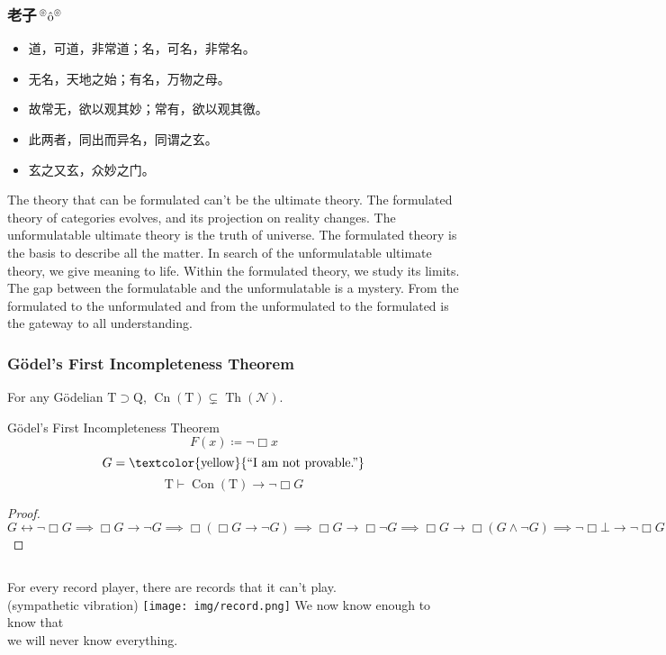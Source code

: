 \documentclass[UTF8,aspectratio=43,11pt,colorlinks,compress,openany]{beamer}%
\begin{document}
\begin{frame}\frametitle{老子$\sideset{^\circledcirc}{^\circledcirc}{\operatorname{\hat{o}}}$}
\begin{itemize}
	\item 道，可道，非常道；名，可名，非常名。
	\item 无名，天地之始；有名，万物之母。
	\item 故常无，欲以观其妙；常有，欲以观其徼。
	\item 此两者，同出而异名，同谓之玄。
	\item 玄之又玄，众妙之门。
\end{itemize}
\begin{block}{}
	The theory that can be formulated can't be the ultimate theory. The formulated theory of categories evolves, and its projection on reality changes. The unformulatable ultimate theory is the truth of universe. The formulated theory is the basis to describe all the matter. In search of the unformulatable ultimate theory, we give meaning to life. Within the formulated theory, we study its limits. The gap between the formulatable and the unformulatable is a mystery. From the formulated to the unformulated and from the unformulated to the formulated is the gateway to all understanding.
\end{block}
\end{frame}

\begin{frame}\frametitle{G\"odel's First Incompleteness Theorem}
\setlength\abovedisplayskip{0pt}
\setlength\belowdisplayskip{0pt}
	\begin{theorem}
		For any G\"odelian $\mathrm{T}\supset \mathrm{Q}$, $\operatorname{Cn}(\mathrm{T})\subsetneq \operatorname{Th}(\mathcal{N})$.
	\end{theorem}
	\begin{block}{G\"odel's First Incompleteness Theorem}
		\[F(x)\coloneqq \neg\Box x\]
		\[G=\text{\textcolor{yellow}{``I am not provable.''}}\]
		\[\mathrm{T}\vdash\operatorname{Con}(\mathrm{T})\to\neg\Box G\]
	\end{block}
\begin{proof}
$G\leftrightarrow\neg\Box G\implies\Box G\to\neg G\implies\Box(\Box G\to\neg G)\implies\Box G\to\Box\neg G\implies\Box G\to\Box(G\wedge\neg G)\implies\neg\Box\bot\to\neg\Box G$
\end{proof}
\begin{columns}
	{\footnotesize For every record player, there are records that it can't play.\\(sympathetic vibration)}
		\texttt{[image: img/record.png]}
	{\large We now know enough to know that\\ we will never know everything.}
\end{columns}
\end{frame}
\end{document}
